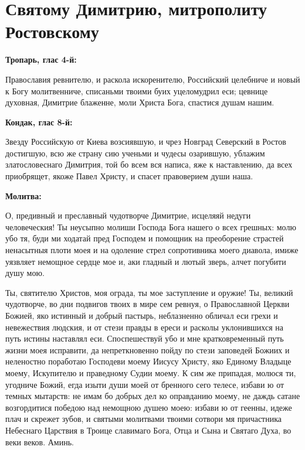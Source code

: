 
 
\vspace{-\baselineskip}
\section{Святому Димитрию, митрополиту Ростовскому}
 


\bfseries Тропарь, глас 4-й:\normalfont{}\nopagebreak


Православия ревнителю, и раскола искоренителю, Российский целебниче и новый к Богу молитвенниче, списаньми твоими буих уцеломудрил еси; цевнице духовная, Димитрие блаженне, моли Христа Бога, спастися душам нашим.


\medskip


\bfseries Кондак, глас 8-й:\normalfont{}\nopagebreak


Звезду Российскую от Киева возсиявшую, и чрез Новград Северский в Ростов достигшую, всю же страну сию ученьми и чудесы озарившую, ублажим златословеснаго Димитрия, той бо всем вся написа, яже к наставлению, да всех приобрящет, якоже Павел Христу, и спасет правоверием души наша.


\medskip


\bfseries Молитва:\normalfont{}\nopagebreak


О, предивный и преславный чудотворче Димитрие, исцеляяй недуги человеческия! Ты неусыпно молиши Господа Бога нашего о всех грешных: молю убо тя, буди ми ходатай пред Господем и помощник на преоборение страстей ненасытныя плоти моея и на одоление стрел сопротивника моего диавола, имиже уязвляет немощное сердце мое и, аки гладный и лютый зверь, алчет погубити душу мою. 

Ты, святителю Христов, моя ограда, ты мое заступление и оружие! Ты, великий чудотворче, во дни подвигов твоих в мире сем ревнуя, о Православной Церкви Божией, яко истинный и добрый пастырь, неблазненно обличал еси грехи и невежествия людския, и от стези правды в ереси и расколы уклонившихся на путь истины наставлял еси. Споспешествуй убо и мне кратковременный путь жизни моея исправити, да непреткновенно пойду по стези заповедей Божиих и неленостно поработаю Господеви моему Иисусу Христу, яко Единому Владыце моему, Искупителю и праведному Судии моему. К сим же припадая, молюся ти, угодниче Божий, егда изыти души моей от бренного сего телесе, избави ю от темных мытарств: не имам бо добрых дел ко оправданию моему, не даждь сатане возгордитися победою над немощною душею моею: избави ю от геенны, идеже плач и скрежет зубов, и святыми молитвами твоими сотвори мя причастника Небеснаго Царствия в Троице славимаго Бога, Отца и Сына и Святаго Духа, во веки веков. Аминь.



